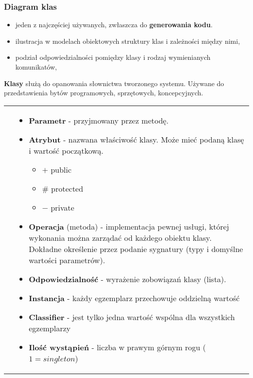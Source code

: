 \documentclass[../main.tex]{subfiles}
\begin{document}
    \subsubsection{Diagram klas}
    \begin{itemize}
        \item jeden z najczęściej używanych, zwłaszcza do \textbf{generowania kodu}.
        \item ilustracja w modelach obiektowych struktury klas i zależności między nimi,
        \item podział odpowiedzialności pomiędzy klasy i rodzaj wymienianych komunikatów,
    \end{itemize}

    \textbf{Klasy} służą do opanowania słownictwa tworzonego systemu. Używane do przedstawienia bytów programowych, sprzętowych,
    koncepcyjnych.


    \begin{table}[H]
        \begin{center}
            \begin{tabular}{ c p{8cm} }
                \raisebox{-\totalheight}{\texttt{[image: diagram\_klasy.png]}}
                &
                \begin{itemize}
                    \item \textbf{Parametr} - przyjmowany przez metodę.
                    \item \textbf{Atrybut} - nazwana właściwość klasy. Może mieć podaną klasę i wartość początkową.
                    \begin{itemize}
                        \item $+$  public
                        \item \# protected
                        \item $-$ private
                    \end{itemize}
                    \item \textbf{Operacja} (metoda) - implementacja pewnej usługi, której wykonania można zarządać
                    od każdego obiektu klasy. Dokładne określenie przez podanie sygnatury (typy i domyślne wartości parametrów).
                    \item \textbf{Odpowiedzialność} - wyrażenie zobowiązań klasy (lista).

                    \item \textbf{Instancja} - każdy egzemplarz przechowuje oddzielną wartość
                    \item \textbf{Classifier} - jest tylko jedna wartość wspólna dla wszystkich egzemplarzy
                    \item \textbf{Ilość wystąpień} - liczba w prawym górnym rogu ($1 = singleton$)
                \end{itemize}
                \\
            \end{tabular}
        \end{center}
    \end{table}
\end{document}
